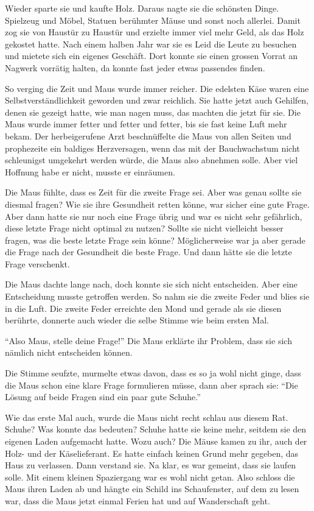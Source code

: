 Wieder sparte sie und kaufte Holz. Daraus nagte sie die schönsten Dinge. Spielzeug und Möbel, Statuen berühmter Mäuse und sonst noch allerlei. Damit zog sie von Haustür zu Haustür und erzielte immer viel mehr Geld, als das Holz gekostet hatte. Nach einem halben Jahr war sie es Leid die Leute zu besuchen und mietete sich ein eigenes Geschäft. Dort konnte sie einen grossen Vorrat an Nagwerk vorrätig halten, da konnte fast jeder etwas passendes finden.

So verging die Zeit und Maus wurde immer reicher. Die edelsten Käse waren eine Selbstverständlichkeit geworden und zwar reichlich. Sie hatte jetzt auch Gehilfen, denen sie gezeigt hatte, wie man nagen muss, das machten die jetzt für sie. Die Maus wurde immer fetter und fetter und fetter, bis sie fast keine Luft mehr bekam. Der herbeigerufene Arzt beschnüffelte die Maus von allen Seiten und prophezeite ein baldiges Herzversagen, wenn das mit der Bauchwachstum nicht schleunigst umgekehrt werden würde, die Maus also abnehmen solle. Aber viel Hoffnung habe er nicht, musste er einräumen.

Die Maus fühlte, dass es Zeit für die zweite Frage sei. Aber was genau sollte sie diesmal fragen? Wie sie ihre Gesundheit retten könne, war sicher eine gute Frage. Aber dann hatte sie nur noch eine Frage übrig und war es nicht sehr gefährlich, diese letzte Frage nicht optimal zu nutzen? Sollte sie nicht vielleicht besser fragen, was die beste letzte Frage sein könne? Möglicherweise war ja aber gerade die Frage nach der Gesundheit die beste Frage. Und dann hätte sie die letzte Frage verschenkt.

Die Maus dachte lange nach, doch konnte sie sich nicht entscheiden. Aber eine Entscheidung musste getroffen werden.  So nahm sie die zweite Feder und blies sie in die Luft. Die zweite Feder erreichte den Mond und gerade als sie diesen berührte, donnerte auch wieder die selbe Stimme wie beim ersten Mal.

\enquote{Also Maus, stelle deine Frage!} Die Maus erklärte ihr Problem, dass sie sich nämlich nicht entscheiden können.

Die Stimme seufzte, murmelte etwas davon, dass es so ja wohl nicht ginge, dass die Maus schon eine klare Frage formulieren müsse, dann aber sprach sie: \enquote{Die Lösung auf beide Fragen sind ein paar gute Schuhe.}

Wie das erste Mal auch, wurde die Maus nicht recht schlau aus diesem Rat. Schuhe? Was konnte das bedeuten? Schuhe hatte sie keine mehr, seitdem sie den eigenen Laden aufgemacht hatte. Wozu auch? Die Mäuse kamen zu ihr, auch der Holz- und der Käselieferant. Es hatte einfach keinen Grund mehr gegeben, das Haus zu verlassen. Dann verstand sie. Na klar, es war gemeint, dass sie laufen solle. Mit einem kleinen Spaziergang war es wohl nicht getan. Also schloss die Maus ihren Laden ab und hängte ein Schild ins Schaufenster, auf dem zu lesen war, dass die Maus jetzt einmal Ferien hat und auf Wanderschaft geht.

